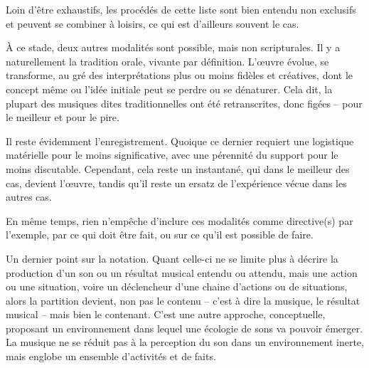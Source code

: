 Loin d'être exhaustifs, les procédés de cette liste sont bien entendu non exclusifs et peuvent se combiner à loisirs, ce qui est d'ailleurs souvent le cas.

\bigskip

À ce stade, deux autres modalités sont possible, mais non scripturales. Il y a naturellement la tradition orale, vivante par définition.  L'œuvre évolue, se transforme, au gré des interprétations plus ou moins fidèles et créatives, dont le concept même ou l'idée initiale peut se perdre ou se dénaturer. Cela dit, la plupart des musiques dites traditionnelles ont été retranscrites, donc figées -- pour le meilleur et pour le pire. 

Il reste évidemment l'enregistrement. Quoique ce dernier requiert une logistique matérielle pour le moins significative, avec une pérennité du support pour le moins discutable. Cependant, cela reste un instantané, qui dans le meilleur des cas, devient l'œuvre, tandis qu'il reste un ersatz de l'expérience vécue dans les autres cas.%

En même temps, rien n'empêche d'inclure ces modalités comme directive(s) par l'exemple, par ce qui doit être fait, ou sur ce qu'il est possible de faire.

\bigskip

Un dernier point sur la notation. Quant celle-ci ne se limite plus à décrire la production d'un son ou un résultat musical entendu ou attendu, mais une action ou une situation, voire un déclencheur d'une chaine d'actions ou de situations, alors la partition devient, non pas le contenu -- c'est à dire la musique, le résultat musical -- mais bien le contenant. C'est une autre approche, conceptuelle, proposant un environnement dans lequel une écologie de sons va pouvoir émerger.  
La musique ne se réduit pas à la perception du son dans un  environnement inerte, mais englobe un ensemble d'activités et de faits.
 
